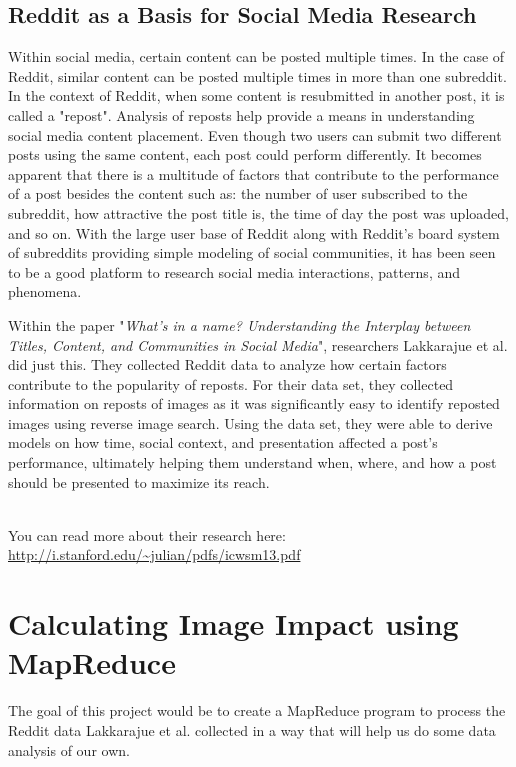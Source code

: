 \documentclass{article}
\begin{document}
\subsection*{Reddit as a Basis for Social Media Research}
Within social media, certain content can be posted multiple times. In the case of Reddit, similar content can be posted multiple times in more than one subreddit. In the context of Reddit, when some content is resubmitted in another post, it is called a "repost". Analysis of reposts help provide a means in understanding social media content placement. Even though two users can submit two different posts using the same content, each post could perform differently. It becomes apparent that there is a multitude of factors that contribute to the performance of a post besides the content such as: the number of user subscribed to the subreddit, how attractive the post title is, the time of day the post was uploaded, and so on. With the large user base of Reddit along with Reddit's board system of subreddits providing simple modeling of social communities, it has been seen to be a good platform to research social media interactions, patterns, and phenomena.

Within the paper "\textit{What's in a name? Understanding the Interplay between Titles, Content, and Communities in Social Media}", researchers Lakkarajue et al. did just this. They collected Reddit data to analyze how certain factors contribute to the popularity of reposts. For their data set, they collected information on reposts of images as it was significantly easy to identify reposted images using reverse image search. Using the data set, they were able to derive models on how time, social context, and presentation affected a post's performance, ultimately helping them understand when, where, and how a post should be presented to maximize its reach.

\-\ \\You can read more about their research here: \url{http://i.stanford.edu/~julian/pdfs/icwsm13.pdf}



\section*{Calculating Image Impact using MapReduce}
The goal of this project would be to create a MapReduce program to process the Reddit data Lakkarajue et al. collected in a way that will help us do some data analysis of our own.
\end{document}
